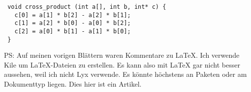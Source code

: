 \documentclass[a4paper,10pt]{article}
\begin{document}
\begin{lstlisting}
 void cross_product (int a[], int b, int* c) {
   c[0] = a[1] * b[2] - a[2] * b[1];
   c[1] = a[2] * b[0] - a[0] * b[2];
   c[2] = a[0] * b[1] - a[1] * b[0];
 }
\end{lstlisting}

PS: Auf meinen vorigen Blättern waren Kommentare zu LaTeX. Ich verwende Kile um LaTeX-Dateien zu erstellen. Es kann also mit LaTeX gar nicht besser aussehen, weil ich nicht Lyx verwende. Es könnte höchstens an Paketen oder am Dokumenttyp liegen. Dies hier ist ein Artikel.
\end{document}
